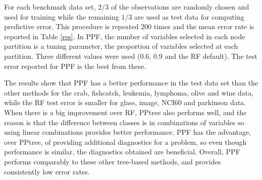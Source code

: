 \documentclass[12pt]{article}\usepackage[]{graphicx}\usepackage[]{color}
\begin{document}
For each benchmark data set, $2/3$ of the observations are randomly chosen and used for training while the remaining $1/3$ are used as test data for computing predictive error. This procedure is repeated 200 times and the mean error rate is reported in Table \ref{res}. In PPF, the number of variables selected in each node partition is a tuning parameter, the proportion of variables selected at each partition. Three different values were used (0.6, 0.9 and the RF default). The test error reported for PPF is the best from these.

The results show that PPF has a better performance in the test data set than the other methods for the crab, fishcatch, leukemia, lymphoma, olive and wine data, while the RF test error is smaller for glass, image, NCI60 and parkinson data. When there is a big improvement over RF, PPtree also performs well, and the reason is that the difference between classes is in combinations of variables so using linear combinations provides better performance. PPF has the advantage, over PPtree, of providing additional diagnostics for a problem, so even though performance is similar, the diagnostics obtained are beneficial. Overall, PPF performs comparably to these other tree-based methods, and provides consistently low error rates.
\end{document}
